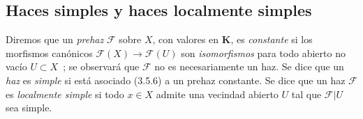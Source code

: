 \subsection{Haces simples y haces localmente simples}

\begin{env}[3.6.1]
\label{0.3.6.1-fr}
Diremos que un \emph{prehaz} $\mathcal{F}$ sobre $X$, con valores en
$\boldsymbol{K}$, es \emph{constante} si los morfismos canónicos
$\mathcal{F}(X)\to\mathcal{F}(U)$ son \emph{isomorfismos} para todo
abierto no vacío $U\subset X$~; se observará que $\mathcal{F}$ no es
necesariamente un haz. Se dice que un \emph{haz} es \emph{simple}
si está asociado (3.5.6) a un prehaz constante. Se dice que un haz
$\mathcal{F}$ es \emph{localmente simple} si todo $x\in X$ admite una vecindad
abierto $U$ tal que $\mathcal{F}|U$ sea simple.
\end{env}
